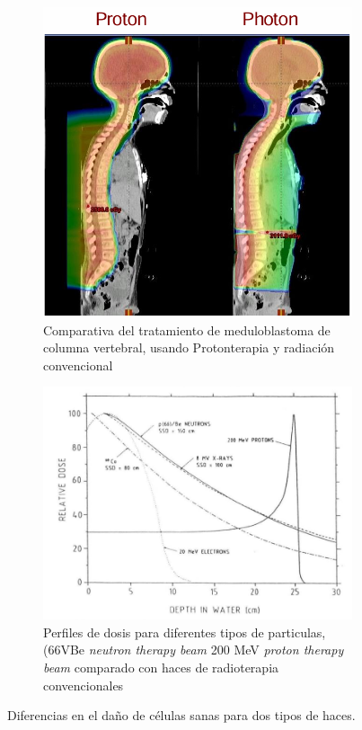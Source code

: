 \documentclass[onecolumn,12pt]{article} %
\begin{document}
\begin{figure}[H]
    \centering
    \begin{subfigure}[b]{0.45\textwidth}
        \centering
        \includegraphics[width=\textwidth]{img_intro/protonterapia.png}
        \caption{Comparativa del tratamiento de meduloblastoma de columna vertebral, usando Protonterapia y radiación convencional}
        \label{fig:medula}
    \end{subfigure}
    \hfill
    \begin{subfigure}[b]{0.5\textwidth}
        \centering
        \includegraphics[width=\textwidth]{img_intro/Figura_comparacion_dosis.png}
        \caption{Perfiles de dosis para diferentes tipos de particulas,(66VBe \textit{neutron therapy beam} 200 MeV \textit{proton therapy beam} comparado con haces de radioterapia convencionales }
        \label{fig:picoVarasparticulas}
    \end{subfigure}
    \caption{ Diferencias en el daño de células sanas para dos tipos de haces.}
    \label{fig:diferenciaradioterapia}
\end{figure}
\end{document}
